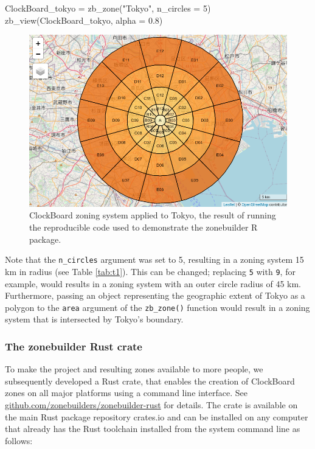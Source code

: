 \documentclass{josis}
\newenvironment{Shaded}{\begin{snugshade}}{\end{snugshade}}
\newcommand{\AttributeTok}[1]{\textcolor[rgb]{0.77,0.63,0.00}{#1}}
\newcommand{\DecValTok}[1]{\textcolor[rgb]{0.00,0.00,0.81}{#1}}
\newcommand{\FloatTok}[1]{\textcolor[rgb]{0.00,0.00,0.81}{#1}}
\newcommand{\FunctionTok}[1]{\textcolor[rgb]{0.00,0.00,0.00}{#1}}
\newcommand{\NormalTok}[1]{#1}
\newcommand{\OtherTok}[1]{\textcolor[rgb]{0.56,0.35,0.01}{#1}}
\newcommand{\StringTok}[1]{\textcolor[rgb]{0.31,0.60,0.02}{#1}}
\begin{document}
\begin{Shaded}
\begin{Highlighting}[]
\NormalTok{ClockBoard\_tokyo }\OtherTok{=} \FunctionTok{zb\_zone}\NormalTok{(}\StringTok{"Tokyo"}\NormalTok{, }\AttributeTok{n\_circles =} \DecValTok{5}\NormalTok{)}
\FunctionTok{zb\_view}\NormalTok{(ClockBoard\_tokyo, }\AttributeTok{alpha =} \FloatTok{0.8}\NormalTok{)}
\end{Highlighting}
\end{Shaded}

\begin{figure}

{\centering \includegraphics[width=0.75\linewidth]{tokyo} 

}

\caption{ClockBoard zoning system applied to Tokyo, the result of running the reproducible code used to demonstrate the zonebuilder R package.}\label{fig:tokyo}
\end{figure}

Note that the \texttt{n\_circles} argument was set to 5, resulting in a zoning system 15 km in radius (see Table \ref{tab:t1}).
This can be changed; replacing \texttt{5} with \texttt{9}, for example, would results in a zoning system with an outer circle radius of 45 km.
Furthermore, passing an object representing the geographic extent of Tokyo as a polygon to the \texttt{area} argument of the \texttt{zb\_zone()} function would result in a zoning system that is intersected by Tokyo's boundary.

\hypertarget{the-zonebuilder-rust-crate}{%
\subsubsection{The zonebuilder Rust crate}\label{the-zonebuilder-rust-crate}}

To make the project and resulting zones available to more people, we subsequently developed a Rust crate, that enables the creation of ClockBoard zones on all major platforms using a command line interface.
See \href{https://github.com/zonebuilders/zonebuilder-rust}{github.com/zonebuilders/zonebuilder-rust} for details.
The crate is available on the main Rust package repository crates.io and can be installed on any computer that already has the Rust toolchain installed from the system command line as follows:
\end{document}
